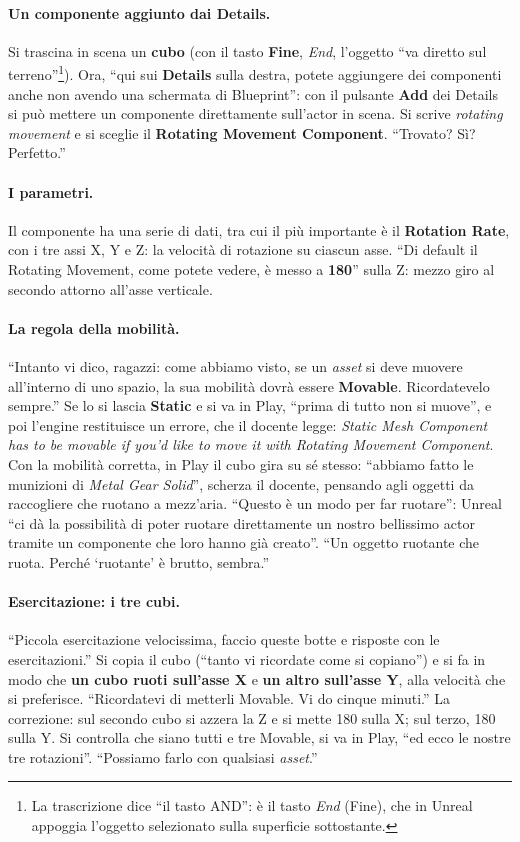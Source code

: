 \paragraph{Un componente aggiunto dai Details.} Si trascina in scena un \textbf{cubo}
(con il tasto \textbf{Fine}, \emph{End}, l'oggetto ``va diretto sul
terreno''\footnote{La trascrizione dice ``il tasto AND'': è il tasto \emph{End} (Fine),
che in Unreal appoggia l'oggetto selezionato sulla superficie sottostante.}). Ora,
``qui sui \textbf{Details} sulla destra, potete aggiungere dei componenti anche non
avendo una schermata di Blueprint'': con il pulsante \textbf{Add} dei Details si può
mettere un componente direttamente sull'actor in scena. Si scrive \emph{rotating
movement} e si sceglie il \textbf{Rotating Movement Component}. ``Trovato? Sì?
Perfetto.''

\paragraph{I parametri.} Il componente ha una serie di dati, tra cui il più importante
è il \textbf{Rotation Rate}, con i tre assi X, Y e Z: la velocità di rotazione su
ciascun asse. ``Di default il Rotating Movement, come potete vedere, è messo a
\textbf{180}'' sulla Z: mezzo giro al secondo attorno all'asse verticale.

\paragraph{La regola della mobilità.} ``Intanto vi dico, ragazzi: come abbiamo visto,
se un \emph{asset} si deve muovere all'interno di uno spazio, la sua mobilità dovrà
essere \textbf{Movable}. Ricordatevelo sempre.'' Se lo si lascia \textbf{Static} e si
va in Play, ``prima di tutto non si muove'', e poi l'engine restituisce un errore,
che il docente legge: \emph{Static Mesh Component has to be movable if you'd like to
move it with Rotating Movement Component}. Con la mobilità corretta, in Play il cubo
gira su sé stesso: ``abbiamo fatto le munizioni di \emph{Metal Gear Solid}'', scherza
il docente, pensando agli oggetti da raccogliere che ruotano a mezz'aria. ``Questo è un
modo per far ruotare'': Unreal ``ci dà la possibilità di poter ruotare direttamente un
nostro bellissimo actor tramite un componente che loro hanno già creato''. ``Un oggetto
ruotante che ruota. Perché `ruotante' è brutto, sembra.''

\paragraph{Esercitazione: i tre cubi.} ``Piccola esercitazione velocissima, faccio
queste botte e risposte con le esercitazioni.'' Si copia il cubo (``tanto vi ricordate
come si copiano'') e si fa in modo che \textbf{un cubo ruoti sull'asse X} e
\textbf{un altro sull'asse Y}, alla velocità che si preferisce. ``Ricordatevi di
metterli Movable. Vi do cinque minuti.'' La correzione: sul secondo cubo si azzera la Z
e si mette 180 sulla X; sul terzo, 180 sulla Y. Si controlla che siano tutti e tre
Movable, si va in Play, ``ed ecco le nostre tre rotazioni''. ``Possiamo farlo con
qualsiasi \emph{asset}.''

